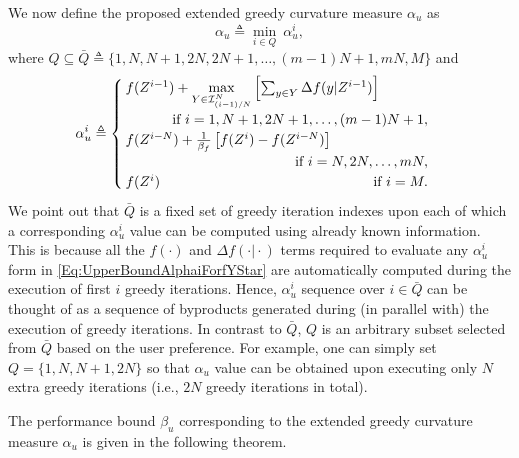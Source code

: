 \documentclass[conference]{IEEEtran}
\begin{document}
We now define the proposed extended greedy curvature measure $\alpha_u$ as 
\begin{equation}\label{Eq:ExtGreedyCurvatureMeasure}
    \alpha_u \triangleq \min_{i \in Q}\ \alpha^i_u,
\end{equation}
where $Q \subseteq \bar{Q} \triangleq \{1,N,N+1,2N,2N+1,\ldots,(m-1)N+1,mN,M\}$ and
\begin{equation}\label{Eq:UpperBoundAlphaiForfYStar}
    \alpha^i_u \triangleq 
    \begin{cases}
     f(Z^{i-1}) + \underset{Y\in\mathcal{I}^N_{(i-1)/N}}{\max} \left[ \sum_{y\in Y} \Delta f(y \vert Z^{i-1})\right]\\
     \ \ \ \ \ \ \ \ \ \ \mbox{if }i=1,N+1,2N+1,\ldots, (m-1)N+1,\\
     f(Z^{i-N}) + \frac{1}{\beta_f}\left[ f(Z^i) - f(Z^{i-N}) \right]\\
     \hfill \mbox{if }i=N,2N,\ldots, mN,\\
     f(Z^i) \hfill \mbox{if }i=M. 
    \end{cases}
\end{equation}
We point out that $\bar{Q}$ is a fixed set of greedy iteration indexes upon each of which a corresponding $\alpha^i_u$ value can be computed using already known information. This is because all the $f(\cdot)$ and $\Delta f(\cdot \vert \cdot)$ terms required to evaluate any $\alpha^i_u$ form in \eqref{Eq:UpperBoundAlphaiForfYStar} are automatically computed during the execution of first $i$ greedy iterations. Hence, $\alpha^i_u$ sequence over $i\in \bar{Q}$ can be thought of as a sequence of byproducts generated during (in parallel with) the execution of greedy iterations. In contrast to $\bar{Q}$, $Q$ is an arbitrary subset selected from $\bar{Q}$ based on the user preference. For example, one can simply set $Q=\{1,N,N+1,2N\}$ so that $\alpha_u$ value can be obtained upon executing only $N$ extra greedy iterations (i.e., $2N$ greedy iterations in total).   

The performance bound $\beta_u$ corresponding to the extended greedy curvature measure $\alpha_u$ is given in the following theorem.
\end{document}
